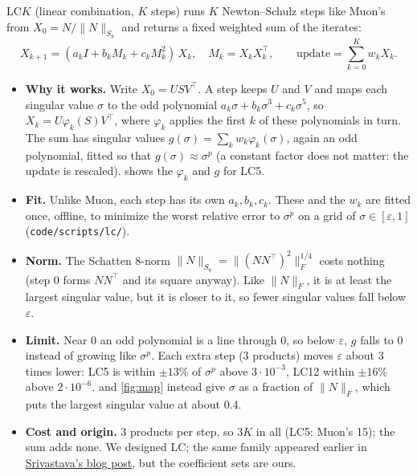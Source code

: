 \documentclass[10pt]{article}
\makeatletter
\renewcommand\paragraph{\@startsection{paragraph}{4}{\z@}{1.0ex \@plus .3ex \@minus .2ex}{-1em}{\normalfont\normalsize\bfseries}}
\makeatother
\begin{document}
\paragraph{LC (sum of iterates).} LC$K$ (linear combination, $K$ steps) runs $K$ Newton--Schulz steps like Muon's from $X_0=N/\|N\|_{S_8}$ and returns a fixed weighted sum of the iterates:
\[ X_{k+1}=(a_kI+b_kM_k+c_kM_k^2)\,X_k,\quad M_k=X_kX_k^\top,\qquad \text{update}=\textstyle\sum_{k=0}^{K} w_kX_k. \]
\begin{itemize}[itemsep=2pt,topsep=3pt,leftmargin=1.5em]
\item \textbf{Why it works.} Write $X_0=USV^\top$. A step keeps $U$ and $V$ and maps each singular value $\sigma$ to the odd polynomial $a_k\sigma+b_k\sigma^3+c_k\sigma^5$, so $X_k=U\varphi_k(S)V^\top$, where $\varphi_k$ applies the first $k$ of these polynomials in turn. The sum has singular values $g(\sigma)=\sum_k w_k\varphi_k(\sigma)$, again an odd polynomial, fitted so that $g(\sigma)\approx\sigma^p$ (a constant factor does not matter: the update is rescaled).  shows the $\varphi_k$ and $g$ for LC5.
\item \textbf{Fit.} Unlike Muon, each step has its own $a_k,b_k,c_k$. These and the $w_k$ are fitted once, offline, to minimize the worst relative error to $\sigma^p$ on a grid of $\sigma\in[\varepsilon,1]$ (\texttt{code/scripts/lc/}).
\item \textbf{Norm.} The Schatten 8-norm $\|N\|_{S_8}=\|(NN^\top)^2\|_F^{1/4}$ costs nothing (step 0 forms $NN^\top$ and its square anyway). Like $\|N\|_F$, it is at least the largest singular value, but it is closer to it, so fewer singular values fall below $\varepsilon$.
\item \textbf{Limit.} Near 0 an odd polynomial is a line through 0, so below $\varepsilon$, $g$ falls to 0 instead of growing like $\sigma^p$. Each extra step (3 products) moves $\varepsilon$ about 3 times lower: LC5 is within $\pm13\%$ of $\sigma^p$ above $3\cdot10^{-3}$, LC12 within $\pm16\%$ above $2\cdot10^{-6}$.  and \cref{fig:map} instead give $\sigma$ as a fraction of $\|N\|_F$, which puts the largest singular value at about 0.4.
\item \textbf{Cost and origin.} 3 products per step, so $3K$ in all (LC5: Muon's 15); the sum adds none. We designed LC; the same family appeared earlier in \href{https://varunneal.github.io/essays/spectral-powers}{Srivastava's blog post}, but the coefficient sets are ours.
\end{itemize}
\end{document}
